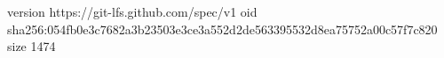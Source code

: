 version https://git-lfs.github.com/spec/v1
oid sha256:054fb0e3c7682a3b23503e3ce3a552d2de563395532d8ea75752a00c57f7c820
size 1474
